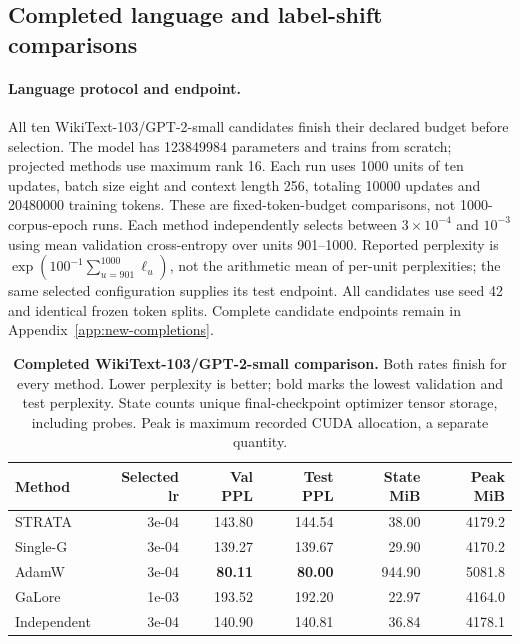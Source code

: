 \FloatBarrier
\subsection{Completed language and label-shift comparisons}\label{app:language-shift-complete}
\paragraph{Language protocol and endpoint.} All ten WikiText-103/GPT-2-small candidates finish their declared budget before selection. The model has 123849984 parameters and trains from scratch; projected methods use maximum rank 16. Each run uses 1000 units of ten updates, batch size eight and context length 256, totaling 10000 updates and 20480000 training tokens. These are fixed-token-budget comparisons, not 1000-corpus-epoch runs. Each method independently selects between $3\times10^{-4}$ and $10^{-3}$ using mean validation cross-entropy over units 901--1000. Reported perplexity is $\exp(100^{-1}\sum_{u=901}^{1000}\ell_u)$, not the arithmetic mean of per-unit perplexities; the same selected configuration supplies its test endpoint. All candidates use seed 42 and identical frozen token splits. Complete candidate endpoints remain in Appendix~\ref{app:new-completions}.

\begin{table}[htbp]\centering\footnotesize
\caption{\textbf{Completed WikiText-103/GPT-2-small comparison.} Both rates finish for every method. Lower perplexity is better; bold marks the lowest validation and test perplexity. State counts unique final-checkpoint optimizer tensor storage, including probes. Peak is maximum recorded CUDA allocation, a separate quantity.}\label{tab:gpt2-complete}
\begin{tabular}{lrrrrr}\toprule Method & Selected lr & Val PPL & Test PPL & State MiB & Peak MiB\\\midrule
\rowcolor{oursbg}
STRATA & 3e-04 & 143.80 & 144.54 & 38.00 & 4179.2 \\
Single-G & 3e-04 & 139.27 & 139.67 & 29.90 & 4170.2 \\
AdamW & 3e-04 & \textbf{80.11} & \textbf{80.00} & 944.90 & 5081.8 \\
GaLore & 1e-03 & 193.52 & 192.20 & 22.97 & 4164.0 \\
Independent & 3e-04 & 140.90 & 140.81 & 36.84 & 4178.1 \\
\bottomrule\end{tabular}\end{table}

